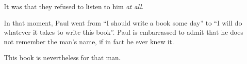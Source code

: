 It was that they refused to listen to him \emph{at all}.

In that moment, Paul went from ``I should write a book some day'' to
``I will do whatever it takes to write this book''.
Paul is embarrassed to admit that he does not remember the man's name,
if in fact he ever knew it.

This book is nevertheless for that man.


